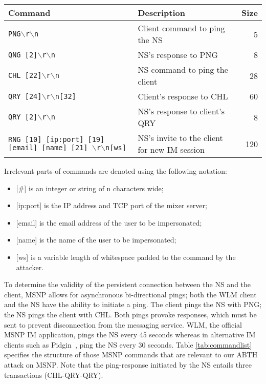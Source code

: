 \documentclass{sig-alternate}
\begin{document}
\begin{table*}[tbp]
	\centering

	\caption {MSNP Commands}
	\label{tab:commandlist}

	\begin{tabular}{llr}
		\hline
		\hline
		\textbf{Command} & \textbf{Description} & \textbf{Size} \\
		\hline
		\texttt{PNG$\backslash$r$\backslash$n} & Client command to ping the NS
& 5 \\
		\texttt{QNG [2]$\backslash$r$\backslash$n} & NS's response to PNG
& 8 \\
		\texttt{CHL [22]$\backslash$r$\backslash$n} & NS command to ping the client
& 28 \\
		\texttt{QRY [24]$\backslash$r$\backslash$n[32]} & Client's response to CHL
& 60 \\
		\texttt{QRY [2]$\backslash$r$\backslash$n} & NS's response to client's QRY
& 8 \\
		\texttt{RNG [10] [ip:port] [19] [email] [name] [21] $\backslash$r$\backslash$n[ws]} & NS's invite to the client for new IM session
& 120 \\
		\hline
	\end{tabular}

	\begin{flushleft}
	Irrelevant parts of commands are denoted using the following notation:
	\begin{itemize}
		\item {[\#]} is an integer or string of n characters wide;
		\item {[ip:port]} is the IP address and TCP port of the mixer server;
		\item {[email]} is the email address of the user to be impersonated;
		\item {[name]} is the name of the user to be impersonated;
		\item {[ws]} is a variable length of whitespace padded to the command by the attacker.
	\end{itemize}
	\end{flushleft}

\end{table*}

To determine the validity of the persistent connection between the NS and the client, MSNP allows for asynchronous bi-directional pings; both the WLM client and the NS have the ability to initiate a ping.
The client pings the NS with PNG; the NS pings the client with CHL.
Both pings provoke responses, which must be sent to prevent disconnection from the messaging service.
WLM, the official MSNP IM application, pings the NS every 45 seconds whereas in alternative IM clients such as Pidgin~\cite{pidgin:url}, ping the NS every 30 seconds.
Table \ref{tab:commandlist} specifies the structure of those MSNP commands that are relevant to our ABTH attack on MSNP.
Note that the ping-response initiated by the NS entails three transactions (CHL-QRY-QRY).
\end{document}
